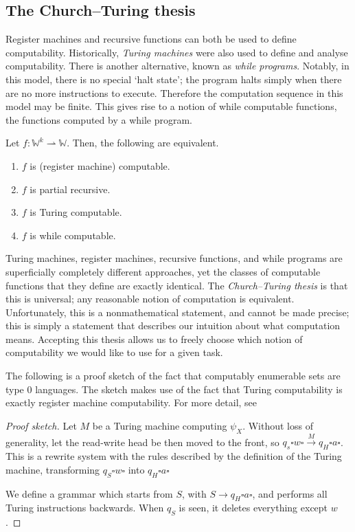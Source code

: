 \subsection{The Church--Turing thesis}
Register machines and recursive functions can both be used to define computability.
Historically, \emph{Turing machines} were also used to define and analyse computability.
There is another alternative, known as \emph{while programs}.
Notably, in this model, there is no special `halt state'; the program halts simply when there are no more instructions to execute.
Therefore the computation sequence in this model may be finite.
This gives rise to a notion of while computable functions, the functions computed by a while program.

\begin{theorem}
	Let \( f \colon \mathbb W^k \rightharpoonup \mathbb W \).
	Then, the following are equivalent.
	\begin{enumerate}
		\item \( f \) is (register machine) computable.
		\item \( f \) is partial recursive.
		\item \( f \) is Turing computable.
		\item \( f \) is while computable.
	\end{enumerate}
\end{theorem}
Turing machines, register machines, recursive functions, and while programs are superficially completely different approaches, yet the classes of computable functions that they define are exactly identical.
The \emph{Church--Turing thesis} is that this is universal; any reasonable notion of computation is equivalent.
Unfortunately, this is a nonmathematical statement, and cannot be made precise; this is simply a statement that describes our intuition about what computation means.
Accepting this thesis allows us to freely choose which notion of computability we would like to use for a given task.

The following is a proof sketch of the fact that computably enumerable sets are type 0 languages.
The sketch makes use of the fact that Turing computability is exactly register machine computability.
For more detail, see
\begin{proof}[Proof sketch]
	Let \( M \) be a Turing machine computing \( \psi_X \).
	Without loss of generality, let the read-write head be then moved to the front, so \( q_s \square w \square \xrightarrow M q_H \square a \square \).
	This is a rewrite system with the rules described by the definition of the Turing machine, transforming \( q_S \square w \square \) into \( q_H \square a \square \)

	We define a grammar which starts from \( S \), with \( S \to q_H \square a \square \), and performs all Turing instructions backwards.
	When \( q_S \) is seen, it deletes everything except \( w \).
\end{proof}


